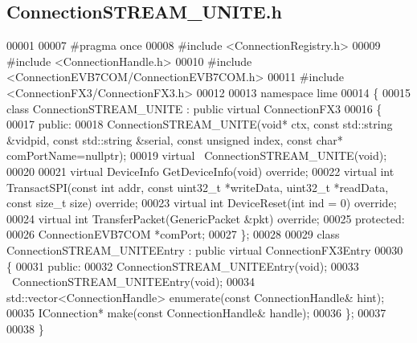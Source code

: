 \subsection{Connection\+S\+T\+R\+E\+A\+M\+\_\+\+U\+N\+I\+T\+E.\+h}
\label{ConnectionSTREAM__UNITE_8h_source}

\begin{DoxyCode}
00001 
00007 \textcolor{preprocessor}{#pragma once}
00008 \textcolor{preprocessor}{#include <ConnectionRegistry.h>}
00009 \textcolor{preprocessor}{#include <ConnectionHandle.h>}
00010 \textcolor{preprocessor}{#include <ConnectionEVB7COM/ConnectionEVB7COM.h>}
00011 \textcolor{preprocessor}{#include <ConnectionFX3/ConnectionFX3.h>}
00012 
00013 \textcolor{keyword}{namespace }lime
00014 \{
00015 \textcolor{keyword}{class }ConnectionSTREAM_UNITE : \textcolor{keyword}{public} \textcolor{keyword}{virtual} ConnectionFX3
00016 \{
00017 \textcolor{keyword}{public}:
00018     ConnectionSTREAM_UNITE(\textcolor{keywordtype}{void}* ctx, \textcolor{keyword}{const} std::string &vidpid, \textcolor{keyword}{const} 
      std::string &serial, \textcolor{keyword}{const} \textcolor{keywordtype}{unsigned} index, \textcolor{keyword}{const} \textcolor{keywordtype}{char}* comPortName=\textcolor{keyword}{nullptr});
00019     \textcolor{keyword}{virtual} ~ConnectionSTREAM_UNITE(\textcolor{keywordtype}{void});
00020 
00021     \textcolor{keyword}{virtual} DeviceInfo GetDeviceInfo(\textcolor{keywordtype}{void}) \textcolor{keyword}{override};
00022     \textcolor{keyword}{virtual} \textcolor{keywordtype}{int} TransactSPI(\textcolor{keyword}{const} \textcolor{keywordtype}{int} addr, \textcolor{keyword}{const} uint32\_t *writeData, uint32\_t *readData, \textcolor{keyword}{const} \textcolor{keywordtype}{size\_t} 
      size) \textcolor{keyword}{override};
00023     \textcolor{keyword}{virtual} \textcolor{keywordtype}{int} DeviceReset(\textcolor{keywordtype}{int} ind = 0) \textcolor{keyword}{override};
00024     \textcolor{keyword}{virtual} \textcolor{keywordtype}{int} TransferPacket(GenericPacket &pkt) \textcolor{keyword}{override};
00025 \textcolor{keyword}{protected}:
00026     ConnectionEVB7COM *comPort;
00027 \};
00028 
00029 \textcolor{keyword}{class }ConnectionSTREAM_UNITEEntry : \textcolor{keyword}{public} \textcolor{keyword}{virtual} ConnectionFX3Entry
00030 \{
00031 \textcolor{keyword}{public}:
00032     ConnectionSTREAM_UNITEEntry(\textcolor{keywordtype}{void});
00033     ~ConnectionSTREAM_UNITEEntry(\textcolor{keywordtype}{void});
00034     std::vector<ConnectionHandle> enumerate(\textcolor{keyword}{const} ConnectionHandle& hint);
00035     IConnection* make(\textcolor{keyword}{const} ConnectionHandle& handle);
00036 \};
00037 
00038 \}
\end{DoxyCode}
